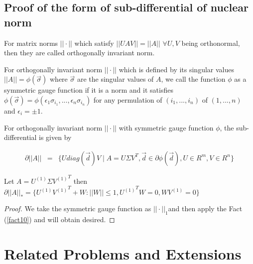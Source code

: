 \documentclass{../common/projectreport}
\begin{document}
\subsection{Proof of the form of sub-differential of nuclear norm }
\begin{definition}
For matrix norms $||\cdot||$ which satisfy $||UAV||=||A||$ $\forall U,V$ being orthonormal, then they are called orthogonally invariant norm. 

\begin{definition}
For orthogonally invariant norm $||\cdot||$ which is defined by its singular values $||A||=\phi(\vec{\sigma})$ where $\vec{\sigma}$ are the singular values of $A$, we call the function $\phi$ as a symmetric gauge function if it is a norm and it satisfies $\phi(\vec{\sigma})=\phi(\epsilon_{1}\sigma_{i_{1}},...,\epsilon_{n}\sigma_{i_{n}})$ for any permulation of $(i_{1},...,i_{n})$ of $(1,...,n)$ and $\epsilon_{i}=\pm1$.

\begin{fact}
\label{fact10}
For orthogonally invariant norm $||\cdot||$ with symmetric
gauge function $\phi$, the sub-differential is given by

\begin{eqnarray*}
\partial||A|| & = & \{Udiag(\vec{d})V\mid A=U\Sigma V^{T},\vec{d}\in\partial\phi(\vec{d}),U\in R^{m},V\in R^{n}\}
\end{eqnarray*}

\end{fact}
\end{definition}
\end{definition}

\begin{thm}
Let $A=U^{(1)}\Sigma{V^{(1)}}^{T}$ then $\partial||A||_{*}=\{U^{(1)}{V^{(1)}}^{T}+W:||W||\le1,{U^{(1)}}^{T}W=0,WV^{(1)}=0\}$ 
\end{thm}

\begin{proof}
We take the symmetric gauge function as $||\cdot||_{1}$and then apply the Fact (\ref{fact10}) and will obtain desired.
\end{proof}



\newpage
\section{Related Problems and Extensions}
\end{document}
